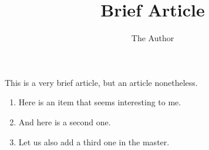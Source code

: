 \documentclass[11pt]{amsart}
\title{Brief Article}
\author{The Author}
\begin{document}
\maketitle
This is a very brief article, but an article nonetheless.
\begin{enumerate}
\item Here is an item that seems interesting to me.
\item And here is a second one.
\item Let us also add a third one in the master.
\end{enumerate}
\end{document}
